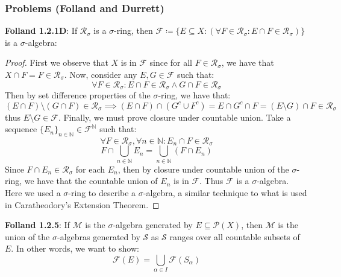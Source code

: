 \documentclass[10pt,letterpaper]{article} %
\begin{document}
\subsubsection{Problems (Folland and Durrett)}
\textbf{Folland 1.2.1D}: If $\mathcal{R}_\sigma$ is a $\sigma$-ring, then $\mathcal{F} \coloneq \{E \subseteq X : (\forall F \in \mathcal{R}_\sigma: E \cap F \in \mathcal{R}_\sigma)\}$ is a $\sigma$-algebra:
\begin{proof}
First we observe that $X$ is in $\mathcal{F}$ since for all $F \in \mathcal{R}_\sigma$, we have that $X \cap F = F \in \mathcal{R}_\sigma$. Now, consider any $E, G \in \mathcal{F}$ such that:
\begin{equation*}
\forall F \in \mathcal{R}_\sigma: E \cap F \in \mathcal{R}_\sigma \land G \cap F \in \mathcal{R}_\sigma
\end{equation*}
Then by set difference properties of the $\sigma$-ring, we have that:
\begin{equation*}
(E \cap F) \setminus (G \cap F) \in \mathcal{R}_\sigma \implies (E \cap F) \cap (G^c \cup F^c) = E \cap G^c \cap F = (E \setminus G) \cap F \in \mathcal{R}_\sigma
\end{equation*}
thus $E\setminus G \in \mathcal{F}$. Finally, we must prove closure under countable union. Take a sequence $\{E_n\}_{n \in \mathbb{N}} \in \mathcal{F}^\mathbb{N}$ such that:
\begin{equation*}
\forall F \in \mathcal{R}_\sigma, \forall n \in \mathbb{N}: E_n \cap F \in \mathcal{R}_\sigma
\end{equation*}
\begin{equation*}
F \cap \bigcup_{n \in \mathbb{N}}E_n = \bigcup_{n \in \mathbb{N}}(F \cap E_n)
\end{equation*}
Since $F \cap E_n \in \mathcal{R}_\sigma$ for each $E_n$, then by closure under countable union of the $\sigma$-ring, we have that the countable union of $E_n$ is in $\mathcal{F}$.
Thus $\mathcal{F}$ is a $\sigma$-algebra. Here we used a $\sigma$-ring to describe a $\sigma$-algebra, a similar technique to what is used in Caratheodory's Extension Theorem.
\end{proof}

\textbf{Folland 1.2.5}: If $\mathcal{M}$ is the $\sigma$-algebra generated by $E \subseteq \mathcal{P}(X)$, then $\mathcal{M}$ is the union of the $\sigma$-algebras generated by $\mathcal{S}$ as $\mathcal{S}$ ranges over all countable subsets of $E$. In other words, we want to show:
\begin{equation*}
\mathcal{F}(E) = \bigcup_{\alpha \in I}\mathcal{F}(S_\alpha)
\end{equation*}
\end{document}
